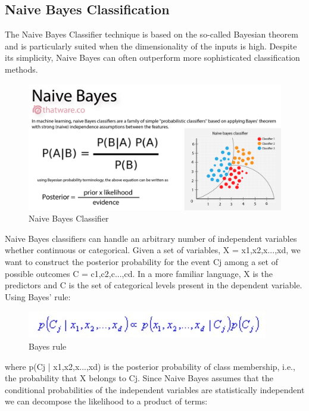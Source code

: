 \subsection{Naive Bayes Classification}

The Naive Bayes Classifier technique is based on the so-called Bayesian theorem and is particularly suited when the dimensionality of the inputs is high. Despite its simplicity, Naive Bayes can often outperform more sophisticated classification methods.

\begin{figure}[h]
	\label{ss}    %
	\centering
	\includegraphics[width= 15 cm]{4.jpg}
	\caption{Naive Bayes Classifier }
\end{figure}

 Naive Bayes classifiers can handle an arbitrary number of independent variables whether continuous or categorical. Given a set of variables, X = {x1,x2,x...,xd}, we want to construct the posterior probability for the event Cj among a set of possible outcomes C = {c1,c2,c...,cd}. In a more familiar language, X is the predictors and C is the set of categorical levels present in the dependent variable. Using Bayes' rule:
\begin{figure}[h]
	\label{ss}    %
	\centering
	\includegraphics[width= 15 cm]{bayers1.jpg}
	\caption{Bayes rule  }
\end{figure}

where p(Cj | x1,x2,x...,xd) is the posterior probability of class membership, i.e., the probability that X belongs to Cj. Since Naive Bayes assumes that the conditional probabilities of the independent variables are statistically independent we can decompose the likelihood to a product of terms:

